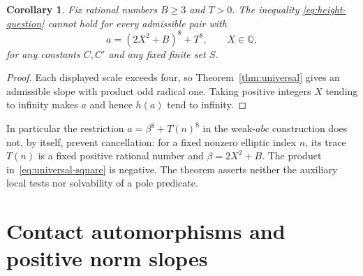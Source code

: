 \documentclass[11pt,a4paper]{article}
\newtheorem{corollary}[theorem]{Corollary}
\newcommand{\Q}{\mathbb Q}\newcommand{\Z}{\mathbb Z}
\begin{document}
\begin{corollary}\label{cor:eighth}
Fix rational numbers $B\ge3$ and $T>0$. The inequality
\eqref{eq:height-question} cannot hold for every admissible pair
with
\[
                   a=(2X^2+B)^8+T^8,\qquad X\in\Q,
\]
for any constants $C,C'$ and any fixed finite set $S$.
\end{corollary}
\begin{proof}
Each displayed scale exceeds four, so
Theorem~\ref{thm:universal} gives an admissible slope with product
odd radical one. Taking positive integers $X$ tending to infinity
makes $a$ and hence $h(a)$ tend to infinity.
\end{proof}

In particular the restriction $a=\beta^8+T(n)^8$ in the
weak-$abc$ construction does not, by itself, prevent cancellation:
for a fixed nonzero elliptic index $n$, its trace $T(n)$ is a
fixed positive rational number and $\beta=2X^2+B$. The product
in~\eqref{eq:universal-square} is negative. The theorem asserts
neither the auxiliary local tests nor solvability of a pole predicate.

\section{Contact automorphisms and positive norm slopes}
\end{document}
